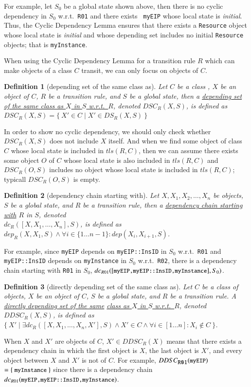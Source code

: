 \documentclass[12pt]{report}
\newtheorem{definition}{Definition}
\newcommand{\mbstt}[1]{\mbox{\small{\tt {#1}}}}
\newcommand{\ul}{\underline}
\begin{document}
\noindent
For example, let $S_0$ be a global state shown above, then there is no
cyclic dependency in $S_0$ w.r.t.\ {\tt R01} and there exists {\tt
  myEIP} whose local state is {\it initial}. Thus, the Cyclic
Dependency Lemma ensures that there exists a {\tt Resource} object
whose local state is {\it initial} and whose depending set includes no
initial {\tt Resource} objects; that is {\tt myInstance}. 

When using the Cyclic Dependency Lemma for a transition rule $R$ which
can make objects of a class $C$ transit, we can only focus on objects
of $C$.
\begin{definition}[depending set of the same class as]
Let $C$ be a class , $X$ be an object of $C$, $R$ be a transition
rule, and $S$ be a global state, then a \ul{depending set of the same
class as $X$ in $S$ w.r.t.\ $R$}, denoted \ul{$DSC_R(X,S)$}, is defined
as $DSC_R(X,S)=\{~X'\in C\mid X'\in DS_R(X,S)~\}$
\end{definition}
In order to show no cyclic dependency, we should only check whether
$DSC_R(X,S)$ does not include $X$ itself. And when we find some object
of class $C$ whose local state is included in $tls(R,C)$, then we can
assume there exists some object $O$ of $C$ whose local state is also
included in $tls(R,C)$ and $DSC_R(O,S)$ includes no object whose local
state is included in $tls(R,C)$; typicall $DSC_R(O,S)$ is empty.

\begin{definition}[dependency chain starting with]
Let $X, X_1, X_2, \dots,X_n$ be objects, $S$ be a global state, and
$R$ be a transition rule, then a \ul{dependency chain starting with}
$R$ in $S$, denoted\\\ul{$dc_R([X, X_1, \dots, X_n],S)$}, is defined as
$dep_R(X, X_1,S) \land \forall i \in \{1 \dots n-1\} : dep(X_i,
X_{i+1},S)$.
\end{definition}
For example, since {\tt myEIP} depends on {\tt myEIP::InsID} in $S_0$
w.r.t.\ {\tt R01} and {\tt myEIP::InsID} depends on {\tt myInstance}
in $S_0$ w.r.t.\ {\tt R02}, there is a dependency chain starting with
{\tt R01} in $S_0$,
$dc_{R01}([\mbstt{myEIP,myEIP::InsID,myInstance}],S_0)$.

\begin{definition}[directly depending set of the same class as]
Let $C$ be a class of objects, $X$ be an object of $C$, $S$ be a
global state, and $R$ be a transition rule. A \ul{directly depending
  set of the same} \ul{class as $X$ in $S$ w.r.t.\ $R$}, denoted
\ul{$DDSC_R(X,S)$}, is defined as $\{~X'\mid\exists
dc_R([X,X_1,\dots,X_n,X'],S)\land X' \in C\land\forall i\in [1
  \dots n]:X_i \not\in C~\}$.
\end{definition}
When $X$ and $X'$ are objects of $C$, $X' \in DDSC_R(X)$ means that
there exists a dependency chain in which the first object is $X$, the
last object is $X'$, and every object between $X$ and $X'$ is not of
$C$. For example, $DDSC_{\mbstt{R01}}(\mbstt{myEIP})$
$=\{~\mbstt{myInstance}~\}$ since there is a dependency chain
$dc_{R01}(\mbstt{myEIP,myEIP::InsID,myInstance})$.
\end{document}
